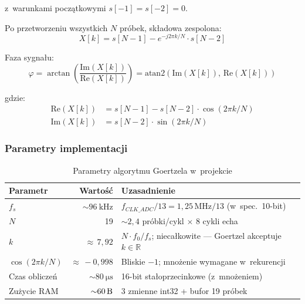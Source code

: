 \documentclass[a4paper,11pt]{article}
\begin{document}
z~warunkami początkowymi $s[-1] = s[-2] = 0$.

Po przetworzeniu wszystkich $N$ próbek, składowa zespolona:
\begin{equation}
    X[k] = s[N-1] - e^{-j2\pi k/N} \cdot s[N-2]
    \label{eq:goertzel_result}
\end{equation}

Faza sygnału:
\begin{equation}
    \varphi = \arctan\!\left(\frac{\text{Im}(X[k])}{\text{Re}(X[k])}\right)
    = \text{atan2}\!\left(\text{Im}(X[k]),\, \text{Re}(X[k])\right)
    \label{eq:goertzel_phase}
\end{equation}

gdzie:
\begin{align}
    \text{Re}(X[k]) &= s[N-1] - s[N-2] \cdot \cos(2\pi k / N) \label{eq:re} \\
    \text{Im}(X[k]) &= s[N-2] \cdot \sin(2\pi k / N) \label{eq:im}
\end{align}

\subsubsection{Parametry implementacji}

\begin{table}[H]
    \centering
    \caption{Parametry algorytmu Goertzela w~projekcie}
    \label{tab:goertzel_params}
    \begin{tabularx}{\textwidth}{l r X}
        \toprule
        \textbf{Parametr} & \textbf{Wartość} & \textbf{Uzasadnienie} \\
        \midrule
        $f_s$ & ${\sim}\SI{96}{\kilo\hertz}$ & $f_{CLK\_ADC}/13 = 1{,}25\,\text{MHz}/13$ (w~spec.\ 10-bit) \\
        $N$ & 19 & ${\sim}2{,}4$ próbki/cykl $\times$ 8 cykli echa \\
        $k$ & ${\approx}\,7{,}92$ & $N \cdot f_0/f_s$; niecałkowite --- Goertzel akceptuje $k \in \mathbb{R}$ \\
        $\cos(2\pi k/N)$ & ${\approx}\,-0{,}998$ & Bliskie $-1$; mnożenie wymagane w~rekurencji \\
        Czas obliczeń & ${\sim}\SI{80}{\micro\second}$ & 16-bit stałoprzecinkowe (z~mnożeniem) \\
        Zużycie RAM & ${\sim}\SI{60}{\byte}$ & 3 zmienne int32 + bufor 19 próbek \\
        \bottomrule
    \end{tabularx}
\end{table}
\end{document}
